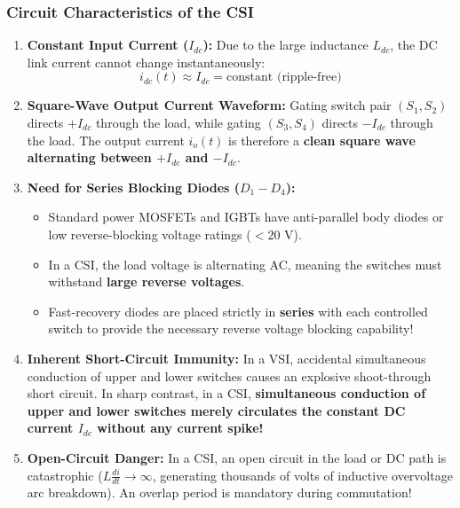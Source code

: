 \documentclass[11pt,a4paper]{article}
\begin{document}
\subsubsection{Circuit Characteristics of the CSI}
\begin{enumerate}[leftmargin=*]
  \item \textbf{Constant Input Current ($I_{dc}$):} Due to the large inductance $L_{dc}$, the DC link current cannot change instantaneously:
  \begin{equation}
  i_{dc}(t) \approx I_{dc} = \text{constant (ripple-free)}
  \end{equation}
  \item \textbf{Square-Wave Output Current Waveform:} Gating switch pair $(S_1, S_2)$ directs $+I_{dc}$ through the load, while gating $(S_3, S_4)$ directs $-I_{dc}$ through the load. The output current $i_o(t)$ is therefore a \textbf{clean square wave alternating between $+I_{dc}$ and $-I_{dc}$}.
  \item \textbf{Need for Series Blocking Diodes ($D_1 - D_4$):}
  \begin{itemize}
    \item Standard power MOSFETs and IGBTs have anti-parallel body diodes or low reverse-blocking voltage ratings ($< 20\text{ V}$).
    \item In a CSI, the load voltage is alternating AC, meaning the switches must withstand \textbf{large reverse voltages}.
    \item Fast-recovery diodes are placed strictly in \textbf{series} with each controlled switch to provide the necessary reverse voltage blocking capability!
  \end{itemize}
  \item \textbf{Inherent Short-Circuit Immunity:} In a VSI, accidental simultaneous conduction of upper and lower switches causes an explosive shoot-through short circuit. In sharp contrast, in a CSI, \textbf{simultaneous conduction of upper and lower switches merely circulates the constant DC current $I_{dc}$ without any current spike!}
  \item \textbf{Open-Circuit Danger:} In a CSI, an open circuit in the load or DC path is catastrophic ($L \frac{di}{dt} \to \infty$, generating thousands of volts of inductive overvoltage arc breakdown). An overlap period is mandatory during commutation!
\end{enumerate}
\end{document}
